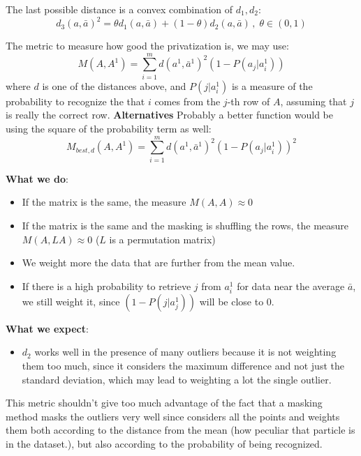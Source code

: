 \documentclass{article}
\renewcommand{\P}{P}
\begin{document}
The last possible distance is a convex combination of $d_1, d_2$:
\begin{equation}
	d_3(a, \bar{a})^2 = \theta d_1(a, \bar{a}) + (1 - \theta) d_2(a, \bar{a}) \, , \; \theta \in (0, 1)
\end{equation}

The metric to measure how good the privatization is, we may use:
\begin{equation}
	M(A, A^1) = \sum_{i=1}^{m} d(a^1, \bar{a}^1)^2 (1 - \P(a_j | a_i^1) )
\end{equation}
where $d$ is one of the distances above, and $\P(j | a_i^1)$ is a measure of the probability to recognize the that $i$ comes from the $j$-th row of $A$, assuming that $j$ is really the correct row. 
\textbf{Alternatives}
Probably a better function would be using the square of the probability term as well:
\begin{equation}
	M_{best,d}(A, A^1) = \sum_{i=1}^{m} d(a^1, \bar{a}^1)^2 (1 - \P(a_j | a_i^1) )^2
\end{equation}

\noindent\textbf{What we do}:
\begin{itemize}
	\item If the matrix is the same, the measure $M(A, A) \approx 0$
	\item If the matrix is the same and the masking is shuffling the rows, the measure $M(A, LA) \approx 0$ ($L$ is a permutation matrix)
	\item We weight more the data that are further from the mean value.
	\item If there is a high probability to retrieve $j$ from $a_i^1$ for data near the average $\bar{a}$, we still weight it, since $(1 - \P(j| a_j^1) )$ will be close to $0$.
\end{itemize}
\noindent\textbf{What we expect}:
\begin{itemize}
	\item $d_2$ works well in the presence of many outliers because it is not weighting them too much, since it considers the maximum difference and not just the standard deviation, which may lead to weighting a lot the single outlier.
\end{itemize}

This metric shouldn't give too much advantage of the fact that a masking method masks the outliers very well since considers all the points and weights them both according to the distance from the mean (how peculiar that particle is in the dataset.), but also according to the probability of being recognized.
\end{document}

